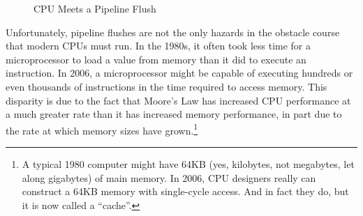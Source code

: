 \begin{figure}[htb]
\begin{center}
\end{center}
\caption{CPU Meets a Pipeline Flush}
\label{fig:cpu:CPU Meets a Pipeline Flush}
\end{figure}

Unfortunately, pipeline flushes are not the only hazards in the obstacle
course that modern CPUs must run.
In the 1980s, it often took less time for a microprocessor to load a value
from memory than it did to execute an instruction.
In 2006, a microprocessor might be capable of executing hundreds or even
thousands of instructions in the time required to access memory.
This disparity is due to the fact that Moore's Law has increased CPU
performance at a much greater rate than it has increased memory
performance, in part due to the rate at which memory sizes have
grown.\footnote{
	A typical 1980 computer might have 64KB (yes, kilobytes,
	not megabytes, let along gigabytes) of main memory.
	In 2006, CPU designers really can construct a 64KB memory
	with single-cycle access.
	And in fact they do, but it is now called a ``cache''.}

